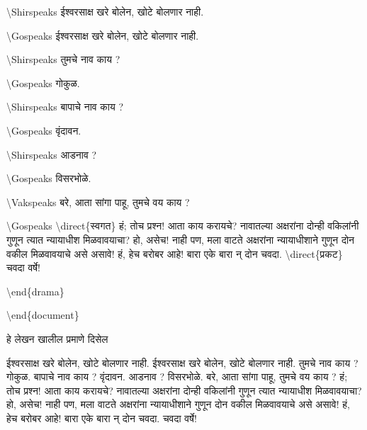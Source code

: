 \documentclass[11pt]{article}
\newcommand{\7}{\textbackslash}
\newcommand{\Syn}{\textenglish}
\begin{document}
\noindent \Syn{\7Shirspeaks} ईश्वरसाक्ष खरे बोलेन, खोटे बोलणार नाही.

\noindent \Syn{\7Gospeaks} ईश्वरसाक्ष खरे बोलेन, खोटे बोलणार नाही.

\noindent \Syn{\7Shirspeaks} तुमचे नाव काय ?

\noindent \Syn{\7Gospeaks} गोकुळ.

\noindent\Syn{\7Shirspeaks} बापाचे नाव काय ?

\noindent\Syn{\7Gospeaks} वृंदावन.

\noindent\Syn{\7Shirspeaks} आडनाव ?

\noindent\Syn{\7Gospeaks} विसरभोळे.

\noindent\Syn{\7Vakspeaks} बरे, आता सांगा पाहू, तुमचे वय काय ?

\noindent\Syn{\7Gospeaks} \Syn{\7direct}\{स्वगत\} हं; तोच प्रश्न! आता काय करायचे? नावातल्या अक्षरांना दोन्ही वकिलांनी गुणून त्यात न्यायाधीश मिळवावयाचा? हो, असेच! नाही पण, मला वाटते अक्षरांना न्यायाधीशाने गुणून दोन वकील मिळवावयाचे असे असावे! हं, हेच बरोबर आहे! बारा एके बारा न् दोन चवदा. \Syn{\7direct}\{प्रकट\} चवदा वर्षे!

\noindent \Syn{\7end\{drama\}}

\noindent \Syn{\7end\{document\}}
\bigskip

हे लेखन खालील प्रमाणे दिसेल
\medskip


\scene[प्रेमसंन्यास; अंक चवथा, प्रवेश सहावा]


\begin{drama}
 \Shirspeaks ईश्वरसाक्ष खरे बोलेन, खोटे बोलणार नाही.
 \Gospeaks ईश्वरसाक्ष खरे बोलेन, खोटे बोलणार नाही.
 \Shirspeaks तुमचे नाव काय ?
 \Gospeaks गोकुळ.
\Shirspeaks बापाचे नाव काय ?
\Gospeaks वृंदावन.
\Shirspeaks आडनाव ?
\Gospeaks विसरभोळे.
\Vakspeaks बरे, आता सांगा पाहू, तुमचे वय काय ?
\Gospeaks {} हं; तोच प्रश्न! आता काय करायचे? नावातल्या अक्षरांना दोन्ही वकिलांनी गुणून त्यात न्यायाधीश मिळवावयाचा? हो, असेच! नाही पण, मला वाटते अक्षरांना न्यायाधीशाने गुणून दोन वकील मिळवावयाचे असे असावे! हं, हेच बरोबर आहे! बारा एके बारा न् दोन चवदा.  चवदा वर्षे!
\end{drama}
\medskip
\end{document}
